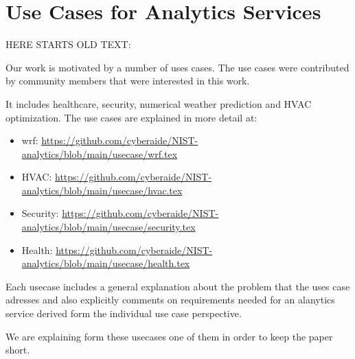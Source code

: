 

\section{Use Cases for Analytics Services}
\label{sec:usecases}







HERE STARTS OLD TEXT:

Our work is motivated by a number of uses cases. The use cases were
contributed by community members that were interested in this work.


It includes healthcare, security, numerical weather prediction and
HVAC optimization. The use cases are explained in more detail at:

\begin{itemize}
\item wrf: \url{https://github.com/cyberaide/NIST-analytics/blob/main/usecase/wrf.tex}
\item HVAC: \url{https://github.com/cyberaide/NIST-analytics/blob/main/usecase/hvac.tex}
\item Security: \url{https://github.com/cyberaide/NIST-analytics/blob/main/usecase/security.tex}
\item Health: \url{https://github.com/cyberaide/NIST-analytics/blob/main/usecase/health.tex}
\end{itemize}

Each usecase includes a general explanation about the problem that the
uses case adresses and also explicitly comments on requirements needed
for an alanytics service derived form the individual use case
perspective.


We are explaining form these usecases one of them in order to keep the paper short. 

